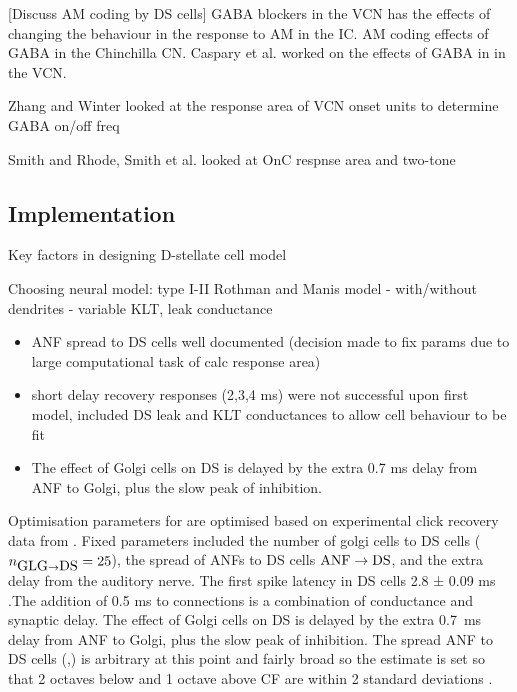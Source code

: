 \medskip{}

[Discuss AM coding by DS cells]
\citep{CasparyPalombiEtAl:2002} GABA blockers in the VCN has the effects of changing the behaviour in the response to AM in the IC.
\citep{BackoffShadduckEtAl:1999} AM coding effects of GABA in the Chinchilla CN.
\citep{CasparyBackoffEtAl:1994}
Caspary et al. worked on the effects of GABA in in the VCN. 

Zhang and Winter looked at the response area of VCN onset units to determine GABA on/off freq

Smith and Rhode, Smith et al. looked at OnC respnse area and two-tone



\subsection{Implementation}
 
Key factors in designing D-stellate cell model

\medskip{}

Choosing neural model: type I-II Rothman and Manis model
  - with/without dendrites
  - variable KLT, leak conductance

\begin{itemize}
\item  ANF spread to DS cells well documented (decision made to
    fix params due to large computational task of calc response area) 
\item  short delay recovery responses (2,3,4 ms) were not successful upon
    first model, included DS leak and KLT conductances to allow cell
    behaviour to be fit
  \item The effect of Golgi cells on DS is delayed by the extra 0.7 ms
    delay from ANF to Golgi, plus the slow peak of \GABAa inhibition.
\end{itemize}

\medskip{}

Optimisation parameters for \GLGDS are optimised based on experimental
click recovery data from \citep{BackoffPalombiEtAl:1997}.  Fixed
parameters included the number of golgi cells to DS cells ($\protect n_{\protect\mbox{GLG} \to \mbox{DS}} =
25$), the spread of ANFs to DS cells $\protect\mbox{ANF} \to \mbox{DS}$, and the extra delay from the auditory
nerve.  The first spike latency in DS cells 2.8 ± 0.09 ms
\citep{RhodeSmith:1986}.The addition of 0.5 ms to \ANFDS connections
is a combination of conductance and synaptic delay. The effect of
Golgi cells on DS is delayed by the extra 0.7~ms delay from ANF to
Golgi, plus the slow peak of \GABAa inhibition.  
The spread ANF to DS cells (\sANFDSh,\sANFDSl) is arbitrary at this point and fairly broad so the
estimate is set so that 2 octaves below and 1 octave above CF are
within 2 standard deviations \citep{PaoliniClark:1999}.

